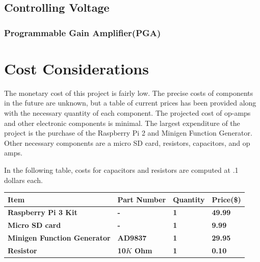 \documentclass{article}	%
\begin{document}
\begin{multicols}{2}
\subsection{Controlling Voltage}

\subsubsection{Programmable Gain Amplifier(PGA)}


\section{Cost Considerations}
The monetary cost of this project is fairly low. 
The precise costs of components in the future are unknown, but
a table 
of current prices has been provided
along with the necessary quantity of each component.
The projected cost of op-amps and other electronic components is minimal. 
The largest expenditure of the project is
the purchase of the 
Raspberry Pi 2 and 
Minigen Function Generator.
Other necessary components are a micro SD card,
resistors, capacitors, and op amps.

In the following table,
costs for capacitors and resistors are computed at .1 dollars each.
\begin{center}
    \begin{tabularx}{0.4\textwidth}{|X|X|X|X|}
        \hline

        \textbf{Item} &
        \textbf{Part Number} &
        \textbf{Quantity} &
        \textbf{Price(\$)} \\
        \hline

        \textbf{Raspberry Pi 3 Kit} &
        \textbf{-} &
        \textbf{1} &
        \textbf{49.99} \\
        \hline

        \textbf{Micro SD card} &
        \textbf{-} &
        \textbf{1} &
        \textbf{9.99} \\
        \hline

        \textbf{Minigen Function Generator} &
        \textbf{AD9837} &
        \textbf{1} &
        \textbf{29.95} \\
        \hline

        \textbf{Resistor} &
        \textbf{10$K$ Ohm} &
        \textbf{1} &
        \textbf{0.10} \\
        \hline


\end{tabularx}
\end{center}
\end{multicols}
\end{document}

